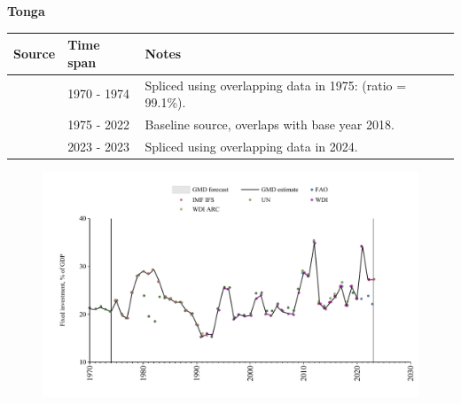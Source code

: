 \documentclass[12pt,a4paper,landscape]{article}
\begin{document}
\begin{adjustbox}{max totalsize={\paperwidth}{\paperheight},center}
\begin{minipage}[t][\textheight][t]{\textwidth}
\vspace*{0.5cm}
{}
\begin{center}
{\Large\bfseries Tonga}
\end{center}
\vspace{0.5cm}
\begin{table}[H]
\centering
\small
\begin{tabular}{|l|l|l|}
\hline
\textbf{Source} & \textbf{Time span} & \textbf{Notes} \\
\hline
\rowcolor{white}\cite{UN}& 1970 - 1974 &Spliced using overlapping data in 1975: (ratio = 99.1\%).\\
\rowcolor{lightgray}\cite{WDI}& 1975 - 2022 &Baseline source, overlaps with base year 2018.\\
\rowcolor{white}\cite{IMF_IFS}& 2023 - 2023 &Spliced using overlapping data in 2024.\\
\hline
\end{tabular}
\end{table}
\begin{figure}[H]
\centering
\includegraphics[width=\textwidth,height=0.6\textheight,keepaspectratio]{graphs/TON_finv_GDP.pdf}
\end{figure}
\end{minipage}
\end{adjustbox}
\end{document}
